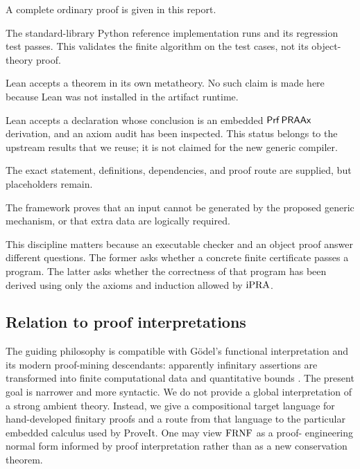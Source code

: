 \begin{description}[style=nextline,leftmargin=2em]
\item[Mathematical theorem.] A complete ordinary proof is given in this report.
\item[Executable finite check.] The standard-library Python reference implementation
runs and its regression test passes.  This validates the finite algorithm on the test
cases, not its object-theory proof.
\item[Host-checked Lean theorem.] Lean accepts a theorem in its own metatheory.  No such
claim is made here because Lean was not installed in the artifact runtime.
\item[Object-checked theorem.] Lean accepts a declaration whose conclusion is an
embedded \(\mathsf{Prf}\,\mathsf{PRAAx}\) derivation, and an axiom audit has been inspected.  This
status belongs to the upstream  results that we reuse; it is not
claimed for the new generic compiler.
\item[Blueprint target.] The exact statement, definitions, dependencies, and proof
route are supplied, but placeholders remain.
\item[Boundary or obstruction.] The framework proves that an input cannot be generated
by the proposed generic mechanism, or that extra data are logically required.
\end{description}

This discipline matters because an executable checker and an object proof answer
different questions.  The former asks whether a concrete finite certificate passes a
program.  The latter asks whether the correctness of that program has been derived
using only the axioms and induction allowed by \(\mathrm{iPRA}\).

\subsection{Relation to proof interpretations}

The guiding philosophy is compatible with G\"odel's functional interpretation and its
modern proof-mining descendants: apparently infinitary assertions are transformed into
finite computational data and quantitative bounds \cite{goedel1958,kohlenbach2008}.
The present goal is narrower and more syntactic.  We do not provide a global
interpretation of a strong ambient theory.  Instead, we give a compositional target
language for hand-developed finitary proofs and a route from that language to the
particular embedded calculus used by ProveIt.  One may view \(\mathrm{FRNF}\) as a proof-
engineering normal form informed by proof interpretation rather than as a new
conservation theorem.

